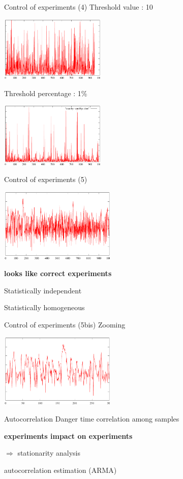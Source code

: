 \documentclass[xcolor=x11names,compress,8pt,
handout
]{beamer}
\renewcommand{\(}{\begin{columns}}
\renewcommand{\)}{\end{columns}}
\newcommand{\<}[1]{\begin{column}{#1}}
\renewcommand{\>}{\end{column}}
\begin{document}
\begin{frame}{Control of experiments (4)}
Threshold value : 10
\begin{center}
\includegraphics[width=5cm]{CE-cauchy-seuil10.pdf}
\end{center}
Threshold percentage  : 1\%
\begin{center}
\includegraphics[width=5cm]{CE-cauchy-seuil1pc.pdf}
\end{center}

\end{frame}
\begin{frame}{Control of experiments (5)}
\begin{center}
\includegraphics[width=5.5cm]{CE-deptempo.pdf}
\end{center}
\pause
\begin{block}{}
\alert{\bf  looks like correct experiments}

Statistically independent

Statistically homogeneous
\end{block}
\end{frame}

\begin{frame}{Control of experiments (5bis)}
Zooming
\begin{center}
\includegraphics[width=5.5cm]{CE-deptempo-zoom.pdf}
\end{center}
\pause
\begin{block}{Autocorrelation}
Danger time correlation among samples

\alert{\bf  experiments impact on experiments}

$\Rightarrow$ stationarity analysis

autocorrelation estimation (ARMA)
\end{block}
\end{frame}
\end{document}
